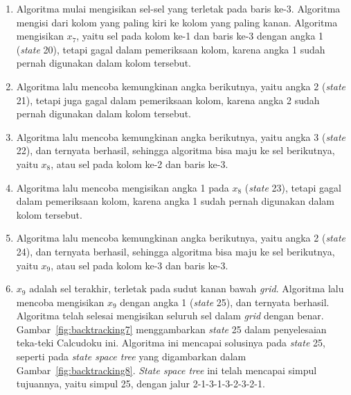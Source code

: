 \begin{enumerate}
\item Algoritma mulai mengisikan sel-sel yang terletak pada baris ke-3. Algoritma mengisi dari kolom yang paling kiri ke kolom yang paling kanan. Algoritma mengisikan \begin{math}x_7\end{math}, yaitu sel pada kolom ke-1 dan baris ke-3 dengan angka 1 (\textit{state} 20), tetapi gagal dalam pemeriksaan kolom, karena angka 1 sudah pernah digunakan dalam kolom tersebut.
\item Algoritma lalu mencoba kemungkinan angka berikutnya, yaitu angka 2 (\textit{state} 21), tetapi juga gagal dalam pemeriksaan kolom, karena angka 2 sudah pernah digunakan dalam kolom tersebut.
\item Algoritma lalu mencoba kemungkinan angka berikutnya, yaitu angka 3 (\textit{state} 22), dan ternyata berhasil, sehingga algoritma bisa maju ke sel berikutnya, yaitu \begin{math}x_8\end{math}, atau sel pada kolom ke-2 dan baris ke-3.
\item Algoritma lalu mencoba mengisikan angka 1 pada \begin{math}x_8\end{math} (\textit{state} 23), tetapi gagal dalam pemeriksaan kolom, karena angka 1 sudah pernah digunakan dalam kolom tersebut.
\item Algoritma lalu mencoba kemungkinan angka berikutnya, yaitu angka 2 (\textit{state} 24), dan ternyata berhasil, sehingga algoritma bisa maju ke sel berikutnya, yaitu \begin{math}x_9\end{math}, atau sel pada kolom ke-3 dan baris ke-3.
\item \begin{math}x_9\end{math} adalah sel terakhir, terletak pada sudut kanan bawah \textit{grid}. Algoritma lalu mencoba mengisikan \begin{math}x_9\end{math} dengan angka 1 (\textit{state} 25), dan ternyata berhasil. Algoritma telah selesai mengisikan seluruh sel dalam \textit{grid} dengan benar. Gambar~\ref{fig:backtracking7} menggambarkan \textit{state} 25 dalam penyelesaian teka-teki Calcudoku ini. Algoritma ini mencapai solusinya pada \textit{state} 25, seperti pada \textit{state space tree} yang digambarkan dalam Gambar~\ref{fig:backtracking8}. \textit{State space tree} ini telah mencapai simpul tujuannya, yaitu simpul 25, dengan jalur 2-1-3-1-3-2-3-2-1.


\end{enumerate}

